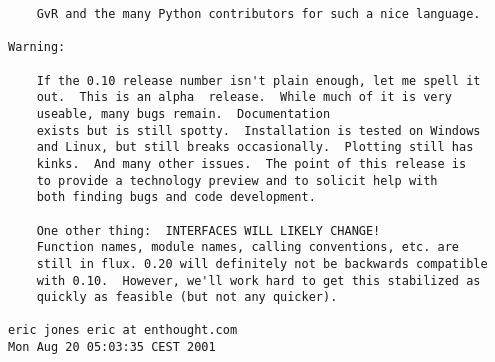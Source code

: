 \begin{verbatim}
    GvR and the many Python contributors for such a nice language.

Warning:

    If the 0.10 release number isn't plain enough, let me spell it
    out.  This is an alpha  release.  While much of it is very
    useable, many bugs remain.  Documentation
    exists but is still spotty.  Installation is tested on Windows
    and Linux, but still breaks occasionally.  Plotting still has
    kinks.  And many other issues.  The point of this release is
    to provide a technology preview and to solicit help with
    both finding bugs and code development.

    One other thing:  INTERFACES WILL LIKELY CHANGE!
    Function names, module names, calling conventions, etc. are
    still in flux. 0.20 will definitely not be backwards compatible
    with 0.10.  However, we'll work hard to get this stabilized as
    quickly as feasible (but not any quicker).

eric jones eric at enthought.com
Mon Aug 20 05:03:35 CEST 2001
\end{verbatim}
